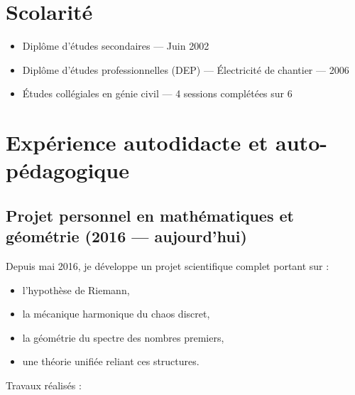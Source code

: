 \documentclass[11pt,a4paper]{article}
\begin{document}
\vspace{0.5cm}

\section*{Scolarité}

\begin{itemize}
    \item Diplôme d'études secondaires — Juin 2002
    \item Diplôme d'études professionnelles (DEP) — Électricité de chantier — 2006
    \item Études collégiales en génie civil — 4 sessions complétées sur 6
\end{itemize}

\section*{Expérience autodidacte et auto-pédagogique}

\subsection*{Projet personnel en mathématiques et géométrie (2016 — aujourd'hui)}

Depuis mai 2016, je développe un projet scientifique complet portant sur :

\begin{itemize}
    \item l'hypothèse de Riemann,
    \item la mécanique harmonique du chaos discret,
    \item la géométrie du spectre des nombres premiers,
    \item une théorie unifiée reliant ces structures.
\end{itemize}

Travaux réalisés :
\end{document}
